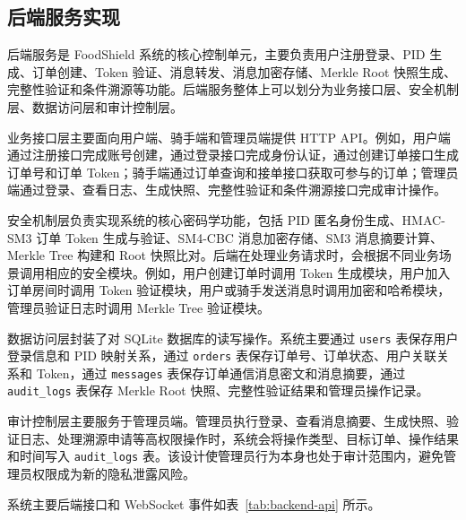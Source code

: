 \subsection{后端服务实现}

后端服务是 FoodShield 系统的核心控制单元，主要负责用户注册登录、PID 生成、订单创建、Token 验证、消息转发、消息加密存储、Merkle Root 快照生成、完整性验证和条件溯源等功能。后端服务整体上可以划分为业务接口层、安全机制层、数据访问层和审计控制层。

业务接口层主要面向用户端、骑手端和管理员端提供 HTTP API。例如，用户端通过注册接口完成账号创建，通过登录接口完成身份认证，通过创建订单接口生成订单号和订单 Token；骑手端通过订单查询和接单接口获取可参与的订单；管理员端通过登录、查看日志、生成快照、完整性验证和条件溯源接口完成审计操作。

安全机制层负责实现系统的核心密码学功能，包括 PID 匿名身份生成、HMAC-SM3 订单 Token 生成与验证、SM4-CBC 消息加密存储、SM3 消息摘要计算、Merkle Tree 构建和 Root 快照比对。后端在处理业务请求时，会根据不同业务场景调用相应的安全模块。例如，用户创建订单时调用 Token 生成模块，用户加入订单房间时调用 Token 验证模块，用户或骑手发送消息时调用加密和哈希模块，管理员验证日志时调用 Merkle Tree 验证模块。

数据访问层封装了对 SQLite 数据库的读写操作。系统主要通过 \texttt{users} 表保存用户登录信息和 PID 映射关系，通过 \texttt{orders} 表保存订单号、订单状态、用户关联关系和 Token，通过 \texttt{messages} 表保存订单通信消息密文和消息摘要，通过 \texttt{audit\_logs} 表保存 Merkle Root 快照、完整性验证结果和管理员操作记录。

审计控制层主要服务于管理员端。管理员执行登录、查看消息摘要、生成快照、验证日志、处理溯源申请等高权限操作时，系统会将操作类型、目标订单、操作结果和时间写入 \texttt{audit\_logs} 表。该设计使管理员行为本身也处于审计范围内，避免管理员权限成为新的隐私泄露风险。

系统主要后端接口和 WebSocket 事件如表~\ref{tab:backend-api} 所示。


